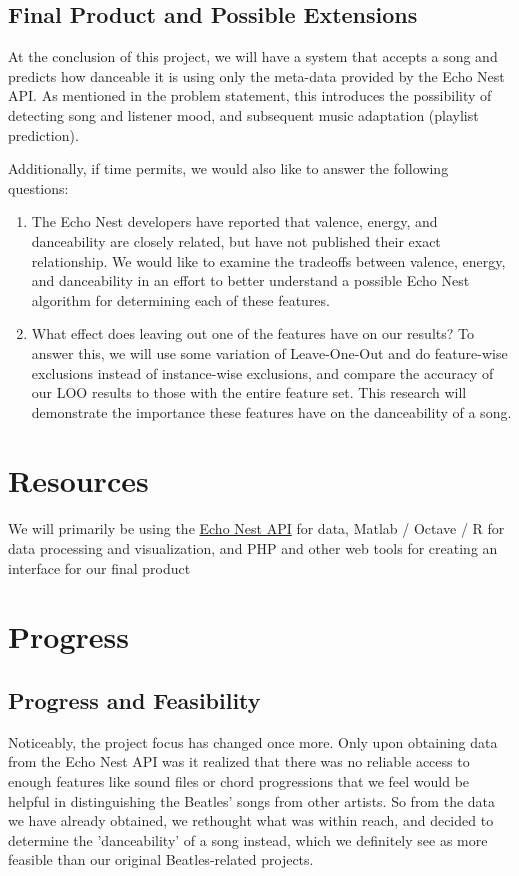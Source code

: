 \documentclass{article}
\begin{document}
\subsection{Final Product and Possible Extensions}
At the conclusion of this project, we will have a system that accepts a song and predicts how danceable it is using only the meta-data provided by the Echo Nest API. As mentioned in the problem statement, this introduces the possibility of detecting song and listener mood, and subsequent music adaptation (playlist prediction).

Additionally, if time permits, we would also like to answer the following questions:

\begin{enumerate}
\item The Echo Nest developers have reported that valence, energy, and danceability are closely related, but have not published their exact relationship. We would like to examine the tradeoffs between valence, energy, and danceability in an effort to better understand a possible Echo Nest algorithm for determining each of these features.
\item What effect does leaving out one of the features have on our results? To answer this, we will use some variation of Leave-One-Out and do feature-wise exclusions instead of instance-wise exclusions, and compare the accuracy of our LOO results to those with the entire feature set. This research will demonstrate the importance these features have on the danceability of a song.
\end{enumerate}

\section{Resources}
We will primarily be using the
\href{http://developer.echonest.com/docs/v4}{Echo Nest API} for data,
Matlab / Octave / R for data processing and visualization, and PHP and
other web tools for creating an interface for our final product

\section{Progress}
\subsection{Progress and Feasibility}
Noticeably, the project focus has changed once more. Only upon obtaining
data from the Echo Nest API was it realized that there was no reliable
access to enough features like sound files or chord progressions that we
feel would be helpful in distinguishing the Beatles' songs from other
artists. So from the data we have already obtained, we rethought what was
within reach, and decided to determine the 'danceability' of a song
instead, which we definitely see as more feasible than our original
Beatles-related projects.
\end{document}
